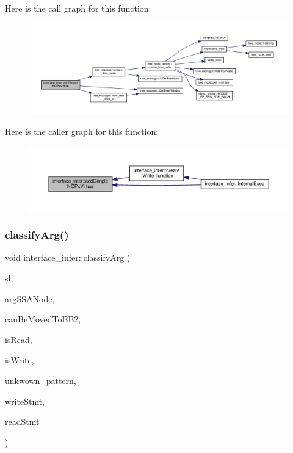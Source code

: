 Here is the call graph for this function\+:
\nopagebreak
\begin{figure}[H]
\begin{center}
\leavevmode
\includegraphics[width=350pt]{d9/d8a/classinterface__infer_aebc13d03184a040770e742f5e9e8320a_cgraph}
\end{center}
\end{figure}
Here is the caller graph for this function\+:
\nopagebreak
\begin{figure}[H]
\begin{center}
\leavevmode
\includegraphics[width=350pt]{d9/d8a/classinterface__infer_aebc13d03184a040770e742f5e9e8320a_icgraph}
\end{center}
\end{figure}
\mbox{\label{classinterface__infer_afb57e923fa70473d88a87f9d9a4482c1}} 
\subsubsection{\texorpdfstring{classify\+Arg()}{classifyArg()}}
{\footnotesize\ttfamily void interface\+\_\+infer\+::classify\+Arg (\begin{DoxyParamCaption}\item[{\hyperlink{structstatement__list}{statement\+\_\+list} $\ast$}]{sl,  }\item[{\hyperlink{tree__node_8hpp_a6ee377554d1c4871ad66a337eaa67fd5}{tree\+\_\+node\+Ref}}]{arg\+S\+S\+A\+Node,  }\item[{bool \&}]{can\+Be\+Moved\+To\+B\+B2,  }\item[{bool \&}]{is\+Read,  }\item[{bool \&}]{is\+Write,  }\item[{bool \&}]{unkwown\+\_\+pattern,  }\item[{std\+::list$<$ \hyperlink{tree__node_8hpp_a6ee377554d1c4871ad66a337eaa67fd5}{tree\+\_\+node\+Ref} $>$ \&}]{write\+Stmt,  }\item[{std\+::list$<$ \hyperlink{tree__node_8hpp_a6ee377554d1c4871ad66a337eaa67fd5}{tree\+\_\+node\+Ref} $>$ \&}]{read\+Stmt }\end{DoxyParamCaption})\hspace{0.3cm}{\ttfamily [private]}}




